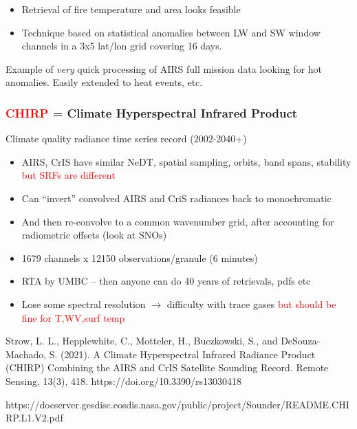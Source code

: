 \documentclass[10pt,t]{beamer}
\begin{document}
\begin{frame}
\vspace{-0.05in}

\small
\vspace{-0.05in}
\begin{itemize}
\item Retrieval of fire temperature and area looks feasible
\item Technique based on statistical anomalies between LW and SW window channels in a 3x5 lat/lon grid covering 16 days.
\end{itemize}
\vspace{-0.05in}
Example of \emph{very} quick processing of AIRS full mission data looking for hot anomalies.   Easily extended to heat events, etc.  
\end{frame}

\begin{frame}
\frametitle{\textcolor{red}{CHIRP} = Climate Hyperspectral Infrared Product}
\small Climate quality radiance time series record (2002-2040+)

\begin{itemize}
  \item AIRS, CrIS have similar NeDT, spatial sampling, orbits, band spans, stability \textcolor{red}{but SRFs are different}
  \item Can ``invert'' convolved AIRS and CriS radiances back to monochromatic
  \item And then re-convolve to a common wavenumber grid, after accounting for radiometric offsets (look at SNOs)
  \item 1679 channels x 12150 observations/granule (6 minutes)
  \item RTA by UMBC -- then anyone can do 40 years of retrievals, pdfs etc
  \item Lose some spectral resolution $\rightarrow$ difficulty with trace gases \textcolor{red}{but should be fine for T,WV,surf temp}
\end{itemize}

\tiny Strow, L. L., Hepplewhite, C., Motteler, H., Buczkowski, S., and DeSouza-Machado, S. (2021). A
Climate Hyperspectral Infrared Radiance Product (CHIRP) Combining the AIRS and CrIS Satellite
Sounding Record. Remote Sensing, 13(3), 418. https://doi.org/10.3390/rs13030418

https://docserver.gesdisc.eosdis.nasa.gov/public/project/Sounder/README.CHIRP.L1.V2.pdf

\end{frame}
\end{document}
